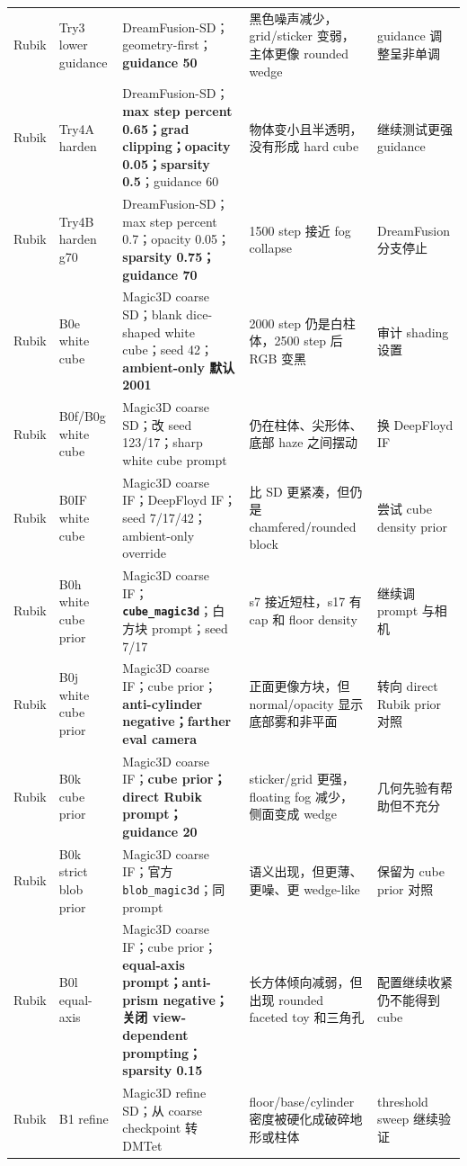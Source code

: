 \documentclass[UTF8,10pt,a4paper]{ctexart}
\begin{document}
\begin{longtable}{p{} p{} p{} p{} p{}}
Rubik & Try3 lower guidance & DreamFusion-SD；geometry-first；\textbf{guidance 50} & 黑色噪声减少，grid/sticker 变弱，主体更像 rounded wedge & guidance 调整呈非单调 \\
Rubik & Try4A harden & DreamFusion-SD；\textbf{max step percent 0.65；grad clipping；opacity 0.05；sparsity 0.5}；guidance 60 & 物体变小且半透明，没有形成 hard cube & 继续测试更强 guidance \\
Rubik & Try4B harden g70 & DreamFusion-SD；max step percent 0.7；opacity 0.05；\textbf{sparsity 0.75；guidance 70} & 1500 step 接近 fog collapse & DreamFusion 分支停止 \\
Rubik & B0e white cube & Magic3D coarse SD；blank dice-shaped white cube；seed 42；\textbf{ambient-only 默认 2001} & 2000 step 仍是白柱体，2500 step 后 RGB 变黑 & 审计 shading 设置 \\
Rubik & B0f/B0g white cube & Magic3D coarse SD；改 seed 123/17；sharp white cube prompt & 仍在柱体、尖形体、底部 haze 之间摆动 & 换 DeepFloyd IF \\
Rubik & B0IF white cube & Magic3D coarse IF；DeepFloyd IF；seed 7/17/42；ambient-only override & 比 SD 更紧凑，但仍是 chamfered/rounded block & 尝试 cube density prior \\
Rubik & B0h white cube prior & Magic3D coarse IF；\textbf{\texttt{cube\_magic3d}}；白方块 prompt；seed 7/17 & s7 接近短柱，s17 有 cap 和 floor density & 继续调 prompt 与相机 \\
Rubik & B0j white cube prior & Magic3D coarse IF；cube prior；\textbf{anti-cylinder negative；farther eval camera} & 正面更像方块，但 normal/opacity 显示底部雾和非平面 & 转向 direct Rubik prior 对照 \\
Rubik & B0k cube prior & Magic3D coarse IF；\textbf{cube prior；direct Rubik prompt；guidance 20} & sticker/grid 更强，floating fog 减少，侧面变成 wedge & 几何先验有帮助但不充分 \\
Rubik & B0k strict blob prior & Magic3D coarse IF；官方 \texttt{blob\_magic3d}；同 prompt & 语义出现，但更薄、更噪、更 wedge-like & 保留为 cube prior 对照 \\
Rubik & B0l equal-axis & Magic3D coarse IF；cube prior；\textbf{equal-axis prompt；anti-prism negative；关闭 view-dependent prompting；sparsity 0.15} & 长方体倾向减弱，但出现 rounded faceted toy 和三角孔 & 配置继续收紧仍不能得到 cube \\
Rubik & B1 refine & Magic3D refine SD；从 coarse checkpoint 转 DMTet & floor/base/cylinder 密度被硬化成破碎地形或柱体 & threshold sweep 继续验证 \\

\end{longtable}
\end{document}
